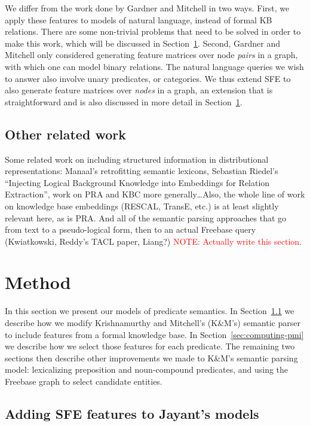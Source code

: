 \documentclass[11pt]{article}
\newcommand{\secref}[1]{Section~\ref{sec:#1}}
\newcommand{\mattnote}[1]{\textcolor{red}{NOTE: #1}}
\begin{document}
We differ from the work done by Gardner and Mitchell in two ways.  First, we
apply these features to models of natural language, instead of formal KB
relations.  There are some non-trivial problems that need to be solved in order
to make this work, which will be discussed in \secref{method}.  Second, Gardner
and Mitchell only considered generating feature matrices over node \emph{pairs}
in a graph, with which one can model binary relations.  The natural language
queries we wish to answer also involve unary predicates, or categories.  We
thus extend SFE to also generate feature matrices over \emph{nodes} in a graph,
an extension that is straightforward and is also discussed in more detail in
\secref{method}.

\subsection{Other related work}

Some related work on including structured information in distributional representations: Manaal's
retrofitting semantic lexicons, Sebastian Riedel's ``Injecting Logical Background Knowledge into
Embeddings for Relation Extraction'', work on PRA and KBC more generally\ldots Also, the whole line
of work on knowledge base embeddings (RESCAL, TransE, etc.) is at least slightly relevant here, as
is PRA.  And all of the semantic parsing approaches that go from text to a pseudo-logical form,
then to an actual Freebase query (Kwiatkowski, Reddy's TACL paper, Liang?) \mattnote{Actually write
this section}.

\section{Method}
\label{sec:method}

In this section we present our models of predicate semantics.  In
\secref{formal-and-distributional} we describe how we modify Krishnamurthy and
Mitchell's (K\&M's) semantic parser to include features from a formal knowledge base.
In \secref{computing-pmi} we describe how we select those features for each
predicate.  The remaining two sections then describe other improvements we made
to K\&M's semantic parsing model: lexicalizing preposition and noun-compound
predicates, and using the Freebase graph to select candidate entities.

\subsection{Adding SFE features to Jayant's models}
\label{sec:formal-and-distributional}
\end{document}
